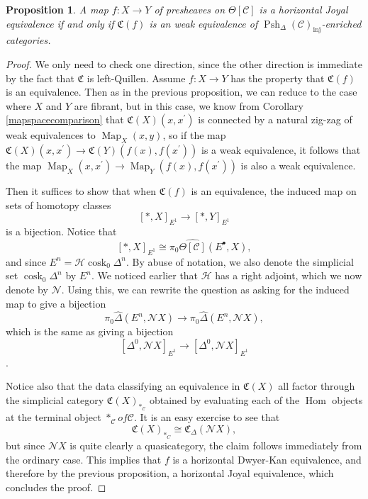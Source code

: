 \documentclass{amsart}
\numberwithin{equation}{section}
\theoremstyle{plain}   %
\newtheorem{prop}[subsection]{Proposition}
\theoremstyle{remark}
\theoremstyle{plain}
\DeclareMathOperator{\Psh}{Psh}
\DeclareMathOperator{\Map}{Map}
\DeclareMathOperator{\Hom}{Hom}
\newcommand{\psh}[1]{\ensuremath{\widehat{#1}}}
\newcommand{\C}{\ensuremath{\mathcal{C}}}
\newcommand{\cellset}{\ensuremath{\widehat{\Theta[\mathcal{C}]}}}
\begin{document}
\begin{prop}\label{conservativity}
	A map \(f:X\to Y\) of presheaves on \(\Theta[\C]\) is a horizontal Joyal equivalence if and only if \(\mathfrak{C}(f)\) is an weak equivalence of \(\Psh_\Delta (\C)_{\mathrm{inj}}\)-enriched categories.
\end{prop}
\begin{proof}
	We only need to check one direction, since the other direction is immediate by the fact that \(\mathfrak{C}\) is left-Quillen.  Assume \(f:X\to Y\) has the property that \(\mathfrak{C}(f)\) is an equivalence. Then as in the previous proposition, we can reduce to the case where \(X\) and \(Y\) are fibrant, but in this case, we know from Corollary \ref{mapspacecomparison} that \(\mathfrak{C}(X)(x,x^\prime)\) is connected by a natural zig-zag of weak equivalences to \(\Map_X(x,y)\), so if the map  \(\mathfrak{C}(X)(x,x^\prime)\to \mathfrak{C}(Y)(f(x),f(x^\prime))\) is a weak equivalence, it follows that the map \(\Map_X(x,x^\prime)\to \Map_Y(f(x),f(x^\prime))\) is also a weak equivalence.

	Then it suffices to show that when \(\mathfrak{C}(f)\) is an equivalence, the induced map on sets of homotopy classes
	\[[\ast,X]_{E^1} \to [\ast,Y]_{E^1}\]
	is a bijection.  Notice that
	\[[\ast,X]_{E^1} \cong \pi_0 \cellset(E^\bullet,X),\]
	and since \(E^n=\mathscr{H}\operatorname{cosk}_0 \Delta^n\). By abuse of notation, we also denote the simplicial set \(\operatorname{cosk}_0 \Delta^n\) by \(E^n\).  We noticed earlier that \(\mathscr{H}\) has a right adjoint, which we now denote by \(\mathscr{N}\). Using this, we can rewrite the question as asking for the induced map to give a bijection
	\[\pi_0 \psh{\Delta}(E^n,\mathscr{N}X) \to \pi_0 \psh{\Delta}(E^n,\mathscr{N}X),\]
	which is the same as giving a bijection
	\[[\Delta^0,\mathscr{N}X]_{E^1}\to [\Delta^0,\mathscr{N}X]_{E^1}\].

	Notice also that the data classifying an equivalence in \(\mathfrak{C}(X)\) all factor through the simplicial category \(\mathfrak{C}(X)_{\ast_\C}\) obtained by evaluating each of the \(\Hom\) objects at the terminal object \(\ast_{\C} of \C\).  It is an easy exercise to see that
	\[\mathfrak{C}(X)_{\ast_C} \cong \mathfrak{C}_\Delta (\mathscr{N}X),\]
	but since \(\mathscr{N}X\) is quite clearly a quasicategory, the claim follows immediately from the ordinary case.  This implies that \(f\) is a horizontal Dwyer-Kan equivalence, and therefore by the previous proposition, a horizontal Joyal equivalence, which concludes the proof.
\end{proof}
\end{document}

